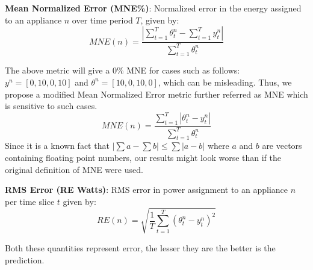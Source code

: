 \documentclass[conference]{IEEEtran}
\begin{document}
\noindent\textbf{Mean Normalized Error (MNE\%)}: Normalized error in the energy assigned to an appliance $n$ over time period $T$, given by:
\begin{equation}
MNE(n)=\frac{|\sum\limits_{t=1}^{T}\theta_t^n-\sum\limits_{t=1}^{T}y_t^n|}{\sum\limits_{t=1}^{T}\theta_t^n} 
\end{equation} 

\noindent The above metric will give a 0\% MNE for cases such as follows: $y^n=[0,10,0,10]$ and $\theta^n=[10,0,10,0]$, which can be misleading. Thus, we propose a modified Mean Normalized Error metric further referred as MNE which is sensitive to such cases.
\begin{equation}
MNE(n)=\frac{\sum\limits_{t=1}^{T}|\theta_t^n-y_t^n|}{\sum\limits_{t=1}^{T}\theta_t^n} 
\end{equation} 
\noindent Since it is a known fact that $|\sum a-\sum b| \le \sum|a-b|$ where $a$ and $b$ are vectors containing floating point numbers, our results might look worse than if the original definition of MNE were used. 

\noindent\textbf{RMS Error (RE Watts)}: RMS error in power assignment to an appliance $n$ per time slice $t$ given by:
\begin{equation}
RE(n)=\sqrt{\frac{1}{T}\sum\limits_{t=1}^{T}(\theta_t^n-y_t^n)^2}
\end{equation}


\noindent Both these quantities represent error, the lesser they are the better is the prediction.

\end{document}
